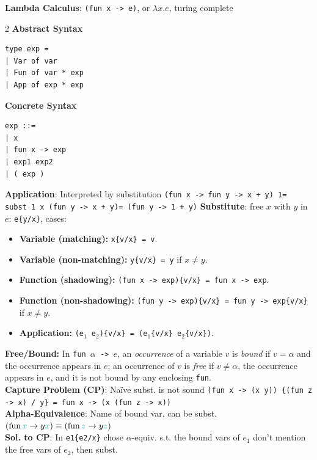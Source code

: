 


\textbf{Lambda Calculus}: \texttt{(fun x -> e)}, or $\lambda x.e$, turing complete 

 \begin{multicols}{2}
\textbf{Abstract Syntax}\\
\begin{lstlisting}
type exp =
| Var of var
| Fun of var * exp 
| App of exp * exp
\end{lstlisting}
\columnbreak

\textbf{Concrete Syntax}\\
\begin{lstlisting}
exp ::=
| x 
| fun x -> exp 
| exp1 exp2 
| ( exp )
\end{lstlisting}
\end{multicols}
\textbf{Application}: Interpreted by substitution {\scriptsize\texttt{(fun x -> fun y -> x + y) 1= subst 1 x (fun y -> x + y)= (fun y -> 1 + y)}}
\textbf{Substitute}: free $x$ with $y$ in $e$: \texttt{e\{y/x\}}, cases:
\begin{itemize}[leftmargin = *,noitemsep]

\item \textbf{Variable (matching):}  
\texttt{x\{v/x\} = v}.

\item \textbf{Variable (non-matching):}  
\texttt{y\{v/x\} = y} if $x \neq y$.

\item \textbf{Function (shadowing):}  
\texttt{(fun x -> exp)\{v/x\} = fun x -> exp}.

\item \textbf{Function (non-shadowing):}  
\texttt{(fun y -> exp)\{v/x\} = fun y -> exp\{v/x\}} if $x \neq y$.

\item \textbf{Application:}  
\texttt{(e$_1$ e$_2$)\{v/x\} = (e$_1$\{v/x\} e$_2$\{v/x\})}.
\end{itemize}

\textbf{Free/Bound:} In \texttt{fun }$\alpha$\texttt{ -> }$e$, an \emph{occurrence} of a variable $v$ is \emph{bound} if $v = \alpha$ and the occurrence appears in $e$; an occurrence of
$v$ is \emph{free} if $v \neq \alpha$, the occurrence appears in $e$, and it is
not bound by any enclosing \texttt{fun}.\\
\textbf{Capture Problem (CP)}: Naïve subst. is not sound  {\scriptsize\texttt{(fun x -> (x y)) \{(fun z -> x) / y\} = fun x -> (x (fun z -> x))}}\\
\textbf{Alpha-Equivalence}: Name of bound var. can be subst. $(\operatorname{fun} {\color{Aquamarine}x} \rightarrow y{\color{Aquamarine}x})\equiv (\operatorname{fun} {\color{Aquamarine}z} \rightarrow  y{\color{Aquamarine}z})$\\
\textbf{Sol. to CP}: In \texttt{e1\{e2/x\}} chose $\alpha$-equiv. s.t. the bound vars of $e_1$ don't mention the free vars of $e_2$, then subst.

